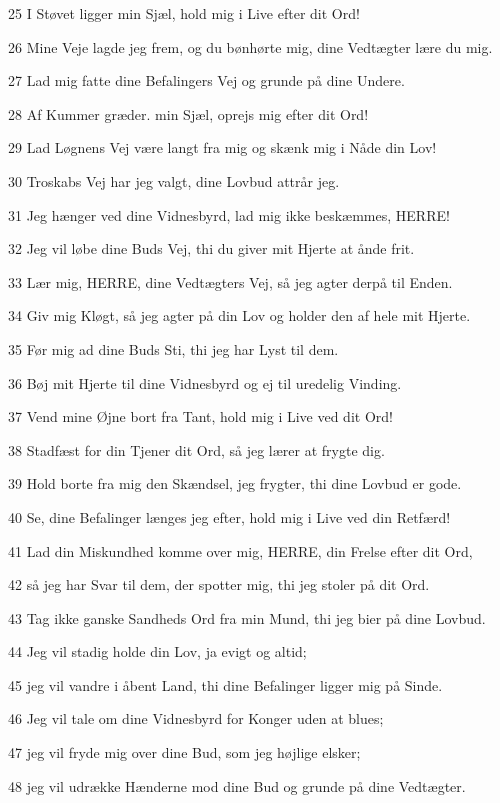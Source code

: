 \par 25 I Støvet ligger min Sjæl, hold mig i Live efter dit Ord!
\par 26 Mine Veje lagde jeg frem, og du bønhørte mig, dine Vedtægter lære du mig.
\par 27 Lad mig fatte dine Befalingers Vej og grunde på dine Undere.
\par 28 Af Kummer græder. min Sjæl, oprejs mig efter dit Ord!
\par 29 Lad Løgnens Vej være langt fra mig og skænk mig i Nåde din Lov!
\par 30 Troskabs Vej har jeg valgt, dine Lovbud attrår jeg.
\par 31 Jeg hænger ved dine Vidnesbyrd, lad mig ikke beskæmmes, HERRE!
\par 32 Jeg vil løbe dine Buds Vej, thi du giver mit Hjerte at ånde frit.
\par 33 Lær mig, HERRE, dine Vedtægters Vej, så jeg agter derpå til Enden.
\par 34 Giv mig Kløgt, så jeg agter på din Lov og holder den af hele mit Hjerte.
\par 35 Før mig ad dine Buds Sti, thi jeg har Lyst til dem.
\par 36 Bøj mit Hjerte til dine Vidnesbyrd og ej til uredelig Vinding.
\par 37 Vend mine Øjne bort fra Tant, hold mig i Live ved dit Ord!
\par 38 Stadfæst for din Tjener dit Ord, så jeg lærer at frygte dig.
\par 39 Hold borte fra mig den Skændsel, jeg frygter, thi dine Lovbud er gode.
\par 40 Se, dine Befalinger længes jeg efter, hold mig i Live ved din Retfærd!
\par 41 Lad din Miskundhed komme over mig, HERRE, din Frelse efter dit Ord,
\par 42 så jeg har Svar til dem, der spotter mig, thi jeg stoler på dit Ord.
\par 43 Tag ikke ganske Sandheds Ord fra min Mund, thi jeg bier på dine Lovbud.
\par 44 Jeg vil stadig holde din Lov, ja evigt og altid;
\par 45 jeg vil vandre i åbent Land, thi dine Befalinger ligger mig på Sinde.
\par 46 Jeg vil tale om dine Vidnesbyrd for Konger uden at blues;
\par 47 jeg vil fryde mig over dine Bud, som jeg højlige elsker;
\par 48 jeg vil udrække Hænderne mod dine Bud og grunde på dine Vedtægter.
